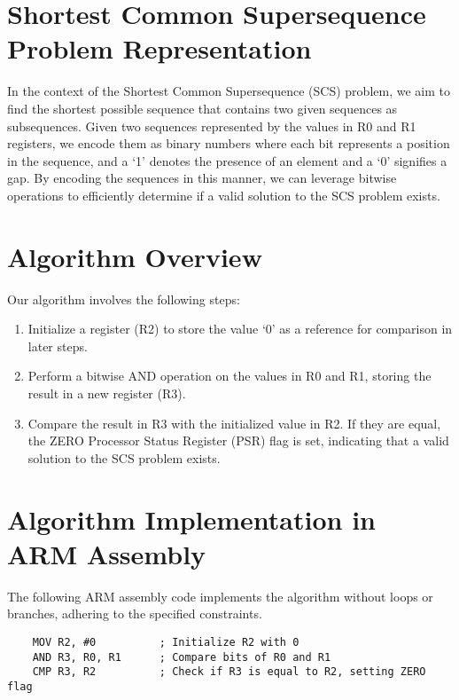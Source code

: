 




\section{Shortest Common Supersequence Problem Representation}
In the context of the Shortest Common Supersequence (SCS) problem, we aim to find the shortest possible sequence that contains two given sequences as subsequences. Given two sequences represented by the values in R0 and R1 registers, we encode them as binary numbers where each bit represents a position in the sequence, and a `1' denotes the presence of an element and a `0' signifies a gap. By encoding the sequences in this manner, we can leverage bitwise operations to efficiently determine if a valid solution to the SCS problem exists.

\section{Algorithm Overview}
Our algorithm involves the following steps:

\begin{enumerate}
    \item Initialize a register (R2) to store the value `0' as a reference for comparison in later steps.
    \item Perform a bitwise AND operation on the values in R0 and R1, storing the result in a new register (R3).
    \item Compare the result in R3 with the initialized value in R2. If they are equal, the ZERO Processor Status Register (PSR) flag is set, indicating that a valid solution to the SCS problem exists.
\end{enumerate}

\section{Algorithm Implementation in ARM Assembly}
The following ARM assembly code implements the algorithm without loops or branches, adhering to the specified constraints.

\begin{verbatim}
    MOV R2, #0          ; Initialize R2 with 0
    AND R3, R0, R1      ; Compare bits of R0 and R1
    CMP R3, R2          ; Check if R3 is equal to R2, setting ZERO flag
\end{verbatim}

